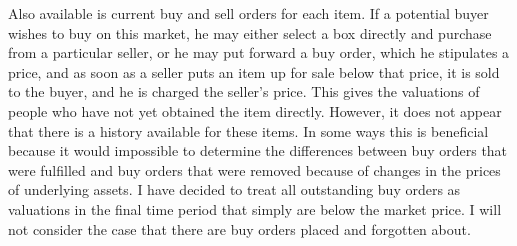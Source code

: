 \documentclass[11pt]{article}
\begin{document}
Also available is current buy and sell orders for each item. If a
potential buyer wishes to buy on this market, he may either select a
box directly and purchase from a particular seller, or he may put
forward a buy order, which he stipulates a price, and as soon as a
seller puts an item up for sale below that price, it is sold to the
buyer, and he is charged the seller's price. This gives the
valuations of people who have not yet obtained the item directly.
However, it does not appear that there is a history available for
these items. In some ways this is beneficial because it would
impossible to determine the differences between buy orders that were
fulfilled and buy orders that were removed because of changes in the
prices of underlying assets. I have decided to treat all outstanding
buy orders as valuations in the final time period that simply are
below the market price. I will not consider the case that there are
buy orders placed and forgotten about.
\end{document}
